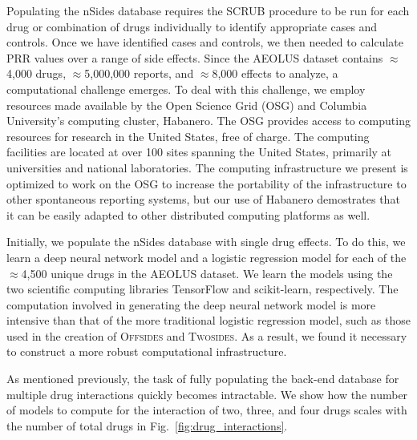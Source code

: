 \documentclass{ws-procs11x85}
\begin{document}
Populating the nSides database requires the SCRUB procedure to be run
for each drug or combination of drugs individually to identify
appropriate cases and controls. Once we have identified cases and
controls, we then needed to calculate PRR values over a range of side
effects. Since the AEOLUS dataset contains $\approx$4,000 drugs,
$\approx$5,000,000 reports, and $\approx$8,000 effects to analyze, a
computational challenge emerges.  To deal with this challenge, we
employ resources made available by the Open Science Grid (OSG) and
Columbia University's computing cluster, Habanero. The OSG provides
access to computing resources for research in the United States, free
of charge. The computing facilities are located at over 100 sites
spanning the United States, primarily at universities and national
laboratories. The computing infrastructure we present is optimized to
work on the OSG to increase the portability of the infrastructure to
other spontaneous reporting systems, but our use of Habanero
demostrates that it can be easily adapted to other distributed
computing platforms as well.

Initially, we populate the nSides database with single drug
effects. To do this, we learn a deep neural network model and a
logistic regression model for each of the $\approx$4,500 unique drugs
in the AEOLUS dataset. We learn the models using the two scientific
computing libraries TensorFlow and scikit-learn, respectively. The
computation involved in generating the deep neural network model is
more intensive than that of the more traditional logistic regression
model, such as those used in the creation of O\textsc{ffsides} and
T\textsc{wosides}. As a result, we found it necessary to construct a
more robust computational infrastructure.

As mentioned previously, the task of fully populating the back-end
database for multiple drug interactions quickly becomes
intractable. We show how the number of models to compute for the
interaction of two, three, and four drugs scales with the number of total
drugs in Fig.~\ref{fig:drug_interactions}.
\end{document}
